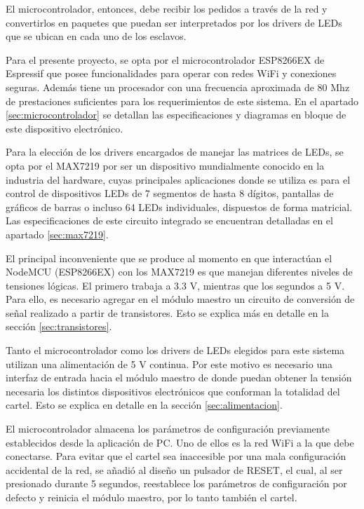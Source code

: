 El microcontrolador, entonces, debe recibir los pedidos a través de la red y convertirlos en paquetes que puedan ser interpretados por los drivers de LEDs que se ubican en cada uno de los esclavos.

Para el presente proyecto, se opta por el microcontrolador ESP8266EX de Espressif que posee funcionalidades para operar con redes WiFi y conexiones seguras. Además tiene un procesador con una frecuencia aproximada de 80 Mhz de prestaciones suficientes para los requerimientos de este sistema. En el apartado \ref{sec:microcontrolador} se detallan las especificaciones y diagramas en bloque de este dispositivo electrónico.

Para la elección de los drivers encargados de manejar las matrices de LEDs, se opta por el MAX7219 por ser un dispositivo mundialmente conocido en la industria del hardware, cuyas principales aplicaciones donde se utiliza es para el control de dispositivos LEDs de 7 segmentos de hasta 8 dígitos, pantallas de gráficos de barras o incluso 64 LEDs individuales, dispuestos de forma matricial.
Las especificaciones de este circuito integrado se encuentran detalladas en el apartado \ref{sec:max7219}.

El principal inconveniente que se produce al momento en que interactúan el NodeMCU (ESP8266EX) con los MAX7219 es que manejan diferentes niveles de tensiones lógicas. El primero trabaja a 3.3 V, mientras que los segundos a 5 V. Para ello, es necesario agregar en el módulo maestro un circuito de conversión de señal realizado a partir de transistores. Esto se explica más en detalle en la sección \ref{sec:transistores}.

Tanto el microcontrolador como los drivers de LEDs elegidos para este sistema utilizan una alimentación de 5 V continua. Por este motivo es necesario una interfaz de entrada hacia el módulo maestro de donde puedan obtener la tensión necesaria los distintos dispositivos electrónicos que conforman la totalidad del cartel. Esto se explica en detalle en la sección \ref{sec:alimentacion}.

El microcontrolador almacena los parámetros de configuración previamente establecidos desde la aplicación de PC. Uno de ellos es la red WiFi a la que debe conectarse. Para evitar que el cartel sea inaccesible por una mala configuración accidental de la red, se añadió al diseño un pulsador de RESET, el cual, al ser presionado durante 5 segundos, reestablece los parámetros de configuración por defecto y reinicia el módulo maestro, por lo tanto también el cartel.

